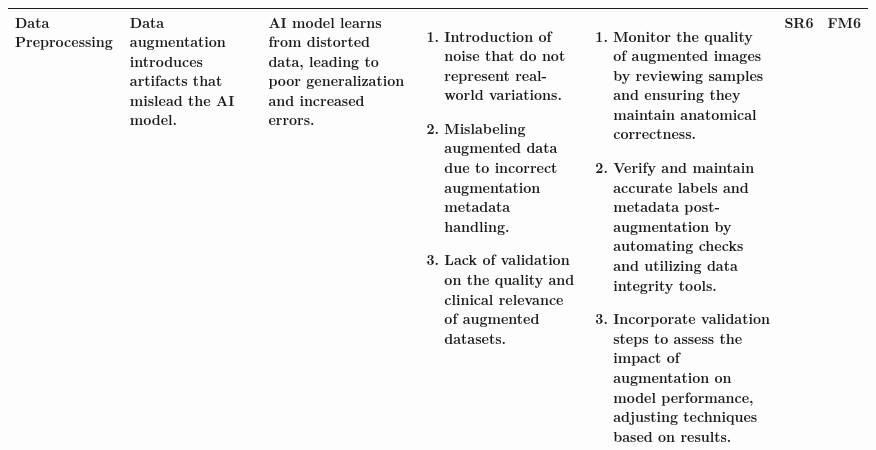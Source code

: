 \documentclass{article}
\begin{document}
\begin{landscape}
\begin{table}[ht]
{\begin{tabular}{|p{2.5cm}|p{2.5cm}|p{3cm}|p{5cm}|p{6cm}|p{1cm}|p{1cm}|}
    Data Preprocessing
     & Data augmentation introduces artifacts that mislead the AI model.
     & AI model learns from distorted data, leading to poor generalization and increased errors.
     &
     \begin{enumerate}[leftmargin=*, label={\alph*.}, itemsep=1pt]
         \item Introduction of noise that do not represent real-world variations.
         \item Mislabeling augmented data due to incorrect augmentation metadata handling.
         \item Lack of validation on the quality and clinical relevance of augmented datasets.
     \end{enumerate}
     &
     \begin{enumerate}[leftmargin=*, label={\alph*.}, itemsep=1pt]
         \item Monitor the quality of augmented images by reviewing samples and ensuring they maintain anatomical correctness.
         \item Verify and maintain accurate labels and metadata post-augmentation by automating checks and utilizing data integrity tools.
         \item Incorporate validation steps to assess the impact of augmentation on model performance, adjusting techniques based on results.
     \end{enumerate}
     & SR6 & FM6 \\ \hline

    \end{tabular}
    }
    \end{table}
\end{landscape}
\end{document}
